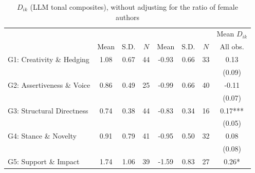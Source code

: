 \begin{table}[H]
    \footnotesize
    \centering
    \begin{threeparttable}
        \caption{\(D_{ik}\) (LLM tonal composites), without adjusting for the ratio of female authors}
        \label{table8llm_R}
        \begin{tabular}{p{3cm}S[table-format=3.3]@{}S[table-format=3.3]@{}S[table-format=3.2]@{}S[table-format=4.3]@{}S[table-format=3.3]@{}S[table-format=3.1]@{}S@{}}
            \toprule
            &&&{{Mean \(D_{ik}\)}}\\\cmidrule(lr){2-4}\cmidrule(lr){5-7}\cmidrule(lr){8-8}&{{Mean}}&{{S.D.}}&{{\(N\)}}&{{Mean}}&{{S.D.}}&{{\(N\)}}&{{All obs.}}\\
            \midrule
            G1: Creativity \& Hedging     &        1.08&        0.67&          44&       -0.93&        0.66&          33&        0.13   \\
                                          &            &            &            &            &            &            &      (0.09)   \\
            G2: Assertiveness \& Voice    &        0.86&        0.49&          25&       -0.99&        0.66&          40&       -0.11   \\
                                          &            &            &            &            &            &            &      (0.07)   \\
            G3: Structural Directness     &        0.74&        0.38&          44&       -0.83&        0.34&          16&        0.17***\\
                                          &            &            &            &            &            &            &      (0.05)   \\
            G4: Stance \& Novelty         &        0.91&        0.79&          41&       -0.95&        0.50&          32&        0.08   \\
                                          &            &            &            &            &            &            &      (0.08)   \\
            G5: Support \& Impact         &        1.74&        1.06&          39&       -1.59&        0.83&          27&        0.26*  \\

\end{tabular}
\end{threeparttable}
\end{table}
